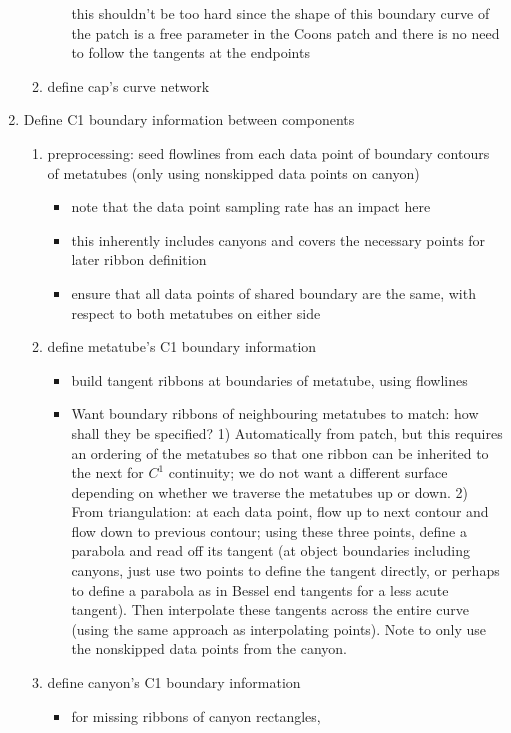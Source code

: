 \documentclass[11pt,titlepage]{article}
\begin{document}
\begin{enumerate}
\begin{enumerate}
\begin{itemize}
	this shouldn't be too hard since the shape of this boundary curve
	of the patch is a free parameter in the Coons patch
	and there is no need to follow the tangents at the endpoints
\end{itemize}
\item define cap's curve network
\end{enumerate}
\item Define C1 boundary information between components
\begin{enumerate}
\item preprocessing: seed flowlines from each data point of boundary contours
	of metatubes (only using nonskipped data points on canyon)
\begin{itemize}
\item   note that the data point sampling rate has an impact here
\item	this inherently includes canyons and covers the necessary points
	for later ribbon definition 
\item   ensure that all data points of shared boundary are the same,
	with respect to both metatubes on either side
\end{itemize}
\item define metatube's C1 boundary information
\begin{itemize}
\item	build tangent ribbons at boundaries of metatube, using flowlines
\item	Want boundary ribbons of neighbouring metatubes to match:
	how shall they be specified?
	1) Automatically from patch, but this requires an ordering of the
		metatubes so that one ribbon can be inherited to the next
		for $C^1$ continuity; we do not want a different surface
		depending on whether we traverse the metatubes up or down.
	2) From triangulation: at each data point, flow up to next contour
		and flow down to previous contour; using these three points,
		define a parabola and read off its tangent
		(at object boundaries including canyons, just use two points 
		to define the tangent directly, or perhaps to define a parabola
		as in Bessel end tangents for a less acute tangent).
		Then interpolate these tangents across the entire curve
		(using the same approach as interpolating points).
		Note to only use the nonskipped data points from the canyon.
\end{itemize}
\item define canyon's C1 boundary information
\begin{itemize}
\item for missing ribbons of canyon rectangles,

\end{itemize}
\end{enumerate}
\end{enumerate}
\end{document}
